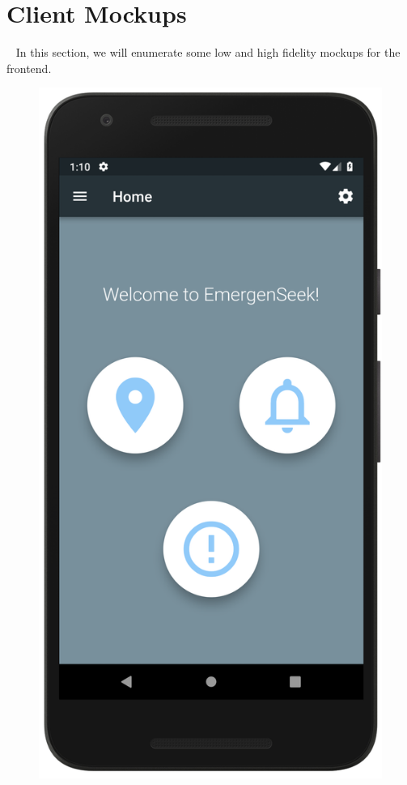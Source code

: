 \documentclass[10pt, a4paper]{article}
\begin{document}
\newpage

\section{Client Mockups}
\par ~ In this section, we will enumerate some low and high fidelity mockups for the frontend.


\begin{figure}[H]
  \includegraphics[width=\linewidth]{demo_home.png}

\end{figure}
\end{document}
